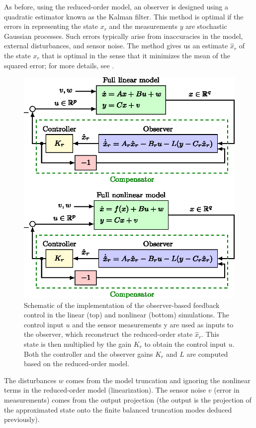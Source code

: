 \documentclass[12pt,lot, lof]{puthesis}
\begin{document}
As before, using the reduced-order model, an observer is designed using a  quadratic estimator known as the Kalman filter. This method is optimal if the errors in representing the state $x_r$ and the measurements $y$ are stochastic Gaussian processes. Such errors typically arise from inaccuracies in the model, external disturbances, and sensor noise. The method gives us an estimate $\hat{x}_r$ of the state $x_r$ that is optimal in the sense that it minimizes the mean of the squared error; for more details, see \citet{Skogestad}.
\begin{figure}[htb]
\centering
  \includegraphics[width=0.8 \linewidth]{lqg1}
  \caption{Schematic of the implementation of the observer-based feedback control in the linear (top) and nonlinear (bottom) simulations. The control input $u$ and the sensor measurements y are used as inputs to the observer, which reconstruct the reduced-order state $\hat{x}_r$. This state is then multiplied by the gain $K_r$ to obtain the control input $u$. Both the controller and the observer gains $K_r$ and $L$ are computed based on the reduced-order model. }
\label{lqg1}
\end{figure}

The disturbances $w$ comes from the model truncation and ignoring the nonlinear terms in the reduced-order model (linearization). The sensor noise $v$ (error in measurements) comes from the output projection (the output is the projection of the approximated state onto the finite balanced truncation modes deduced previously).
\end{document}
